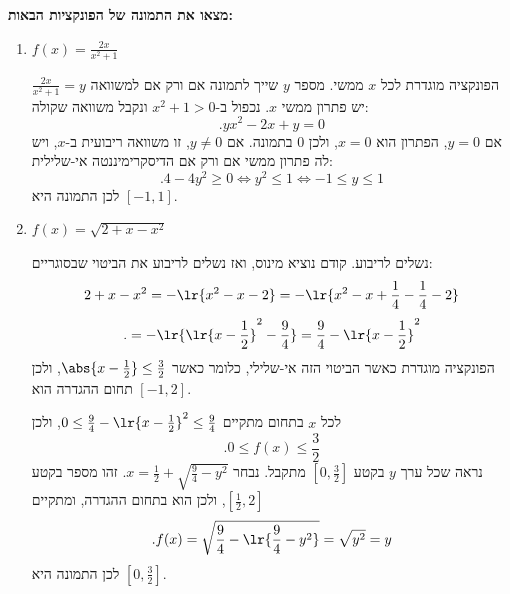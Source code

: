 \textbf{מצאו את התמונה של הפונקציות הבאות:}
\begin{enumerate}
\item $f(x) = \frac{2x}{x^2 + 1}$
\begin{solbox}
הפונקציה מוגדרת לכל $x$ ממשי. מספר $y$ שייך לתמונה אם ורק אם למשוואה
$\frac{2x}{x^2+1}=y$
יש פתרון ממשי $x$. נכפול ב-$x^2+1>0$ ונקבל משוואה שקולה:
$$.yx^2-2x+y=0$$
אם $y=0$, הפתרון הוא $x=0$, ולכן $0$ בתמונה.
אם $y\neq0$, זו משוואה ריבועית ב-$x$, ויש לה פתרון ממשי אם ורק אם הדיסקרימיננטה אי-שלילית:
$$.4-4y^2\geq0\iff y^2\leq1\iff -1\leq y\leq1$$
לכן התמונה היא
$[-1, 1]$.
\end{solbox}
\item $f(x) = \sqrt{2 + x - x^2}$
\begin{solbox}
נשלים לריבוע. קודם נוציא מינוס, ואז נשלים לריבוע את הביטוי שבסוגריים:
$$2+x-x^2=-\lr{x^2-x-2}=-\lr{x^2-x+\frac14-\frac14-2}$$
$$.=-\lr{\lr{x-\frac12}^2-\frac94}=\frac94-\lr{x-\frac12}^2$$
הפונקציה מוגדרת כאשר הביטוי הזה אי-שלילי, כלומר כאשר
$\abs{x-\frac12}\leq\frac32$,
ולכן תחום ההגדרה הוא $[-1,2]$.

לכל $x$ בתחום מתקיים
$0\leq \frac94-\lr{x-\frac12}^2\leq\frac94$,
ולכן
$$.0\leq f(x)\leq\frac32$$
נראה שכל ערך $y$ בקטע $[0,\frac32]$ מתקבל. נבחר
$x=\frac12+\sqrt{\frac94-y^2}$.
זהו מספר בקטע $[\frac12,2]$, ולכן הוא בתחום ההגדרה, ומתקיים
$$.f(x)=\sqrt{\frac94-\lr{\frac94-y^2}}=\sqrt{y^2}=y$$
לכן התמונה היא
$[0, \frac{3}{2}]$.
\end{solbox}
\eMs
\end{enumerate}
